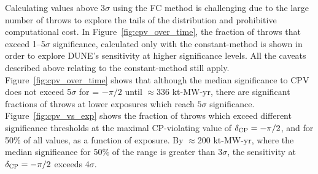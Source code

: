 Calculating \dchisqcrit values above 3$\sigma$ using the FC method is challenging due to the large number of throws to explore the tails of the \dchisqFC distribution and prohibitive computational cost. In Figure~\ref{fig:cpv_over_time}, the fraction of throws that exceed 1--5$\sigma$ significance, calculated only with the constant-\dchisq method is shown in order to explore DUNE's sensitivity at higher significance levels. All the caveats described above relating to the constant-\dchisq method still apply. Figure~\ref{fig:cpv_over_time} shows that although the median significance to CPV does not exceed 5$\sigma$ for \deltacp = $-\pi/2$ until $\approx$336 kt-MW-yr, there are significant fractions of throws at lower exposures which reach $5\sigma$ significance. Figure~\ref{fig:cpv_vs_exp} shows the fraction of throws which exceed different significance thresholds at the maximal CP-violating value of $\delta_{\rm CP} = -\pi/2$, and for 50\% of all \deltacp values, as a function of exposure. By $\approx$200 kt-MW-yr, where the median significance for 50\% of the \deltacp range is greater than 3$\sigma$, the sensitivity at $\delta_{\rm CP} = -\pi/2$ exceeds 4$\sigma$.

\FloatBarrier
